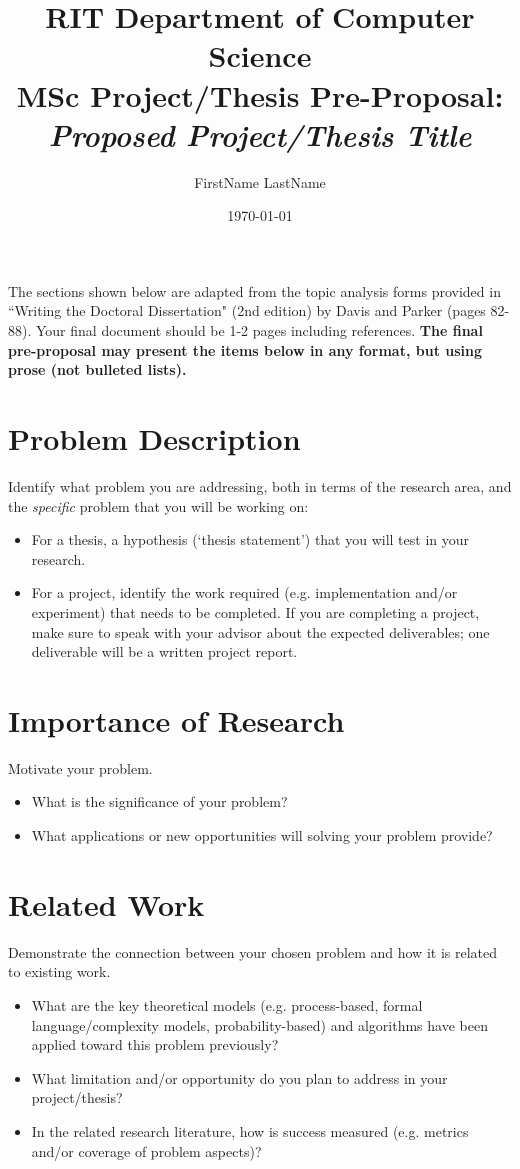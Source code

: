 \documentclass[11pt]{artikel3}
\title{RIT Department of Computer Science\\MSc Project/Thesis Pre-Proposal:\\\emph{Proposed Project/Thesis Title}}
\author{FirstName LastName}
\date{\today}
\begin{document}
\maketitle

The sections shown below are adapted from the topic analysis forms provided in ``Writing the Doctoral Dissertation" (2nd edition) by Davis and Parker (pages 82-88). Your final document should be 1-2 pages including references. {\bf The final pre-proposal may present the items below in any format, but using prose (not bulleted lists).} 

\section{Problem Description}
Identify what problem you are addressing, both in terms of the research area, and the \emph{specific} problem that you will be working on:
\begin{itemize}
	\item For a thesis, a hypothesis (`thesis statement') that you will test in your research.
	\item For a project, identify the work required (e.g. implementation and/or experiment) that needs to be completed. If you are completing a project, make sure to speak with your advisor about the expected deliverables; one deliverable will be a written project report.
\end{itemize}

\section{Importance of Research}
Motivate your problem. 
\begin{itemize}
	\item What is the significance of your problem? 
	\item What applications or new opportunities will solving your problem provide?
\end{itemize}

\section{Related Work}

Demonstrate the connection between your chosen problem and how it is related to existing work. 
\begin{itemize}
	\item What are the key theoretical models (e.g. process-based, formal language/complexity models, probability-based) and algorithms have been applied toward this problem previously? 
	\item What limitation and/or opportunity do you plan to address in your project/thesis?
	\item
In the related research literature, how is success measured (e.g. metrics and/or coverage of problem aspects)?
\end{itemize}
\end{document}
